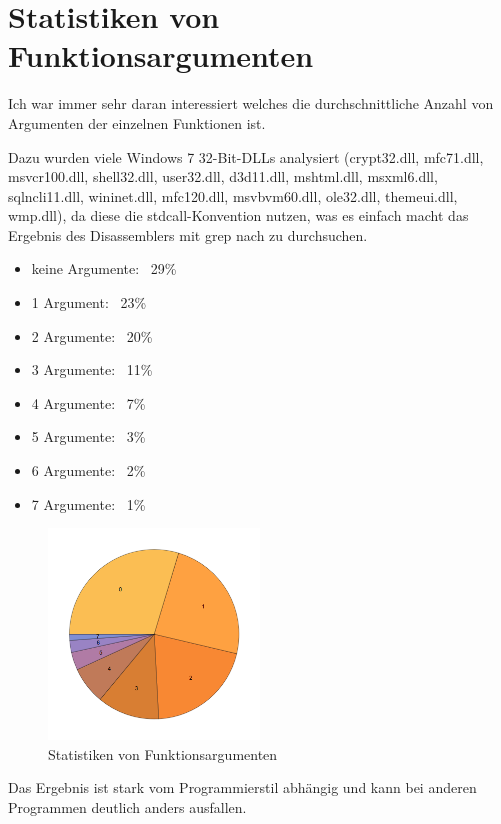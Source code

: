\section{Statistiken von Funktionsargumenten}
\label{args_stat}

Ich war immer sehr daran interessiert welches die durchschnittliche Anzahl von
Argumenten der einzelnen Funktionen ist.

Dazu wurden viele Windows 7 32-Bit-DLLs analysiert
(crypt32.dll, mfc71.dll, msvcr100.dll, shell32.dll, user32.dll, d3d11.dll, mshtml.dll,
msxml6.dll, sqlncli11.dll, wininet.dll, mfc120.dll, msvbvm60.dll, ole32.dll, themeui.dll,
wmp.dll), da diese die stdcall-Konvention nutzen, was es einfach macht das Ergebnis des
Disassemblers mit grep nach  zu durchsuchen.

\begin{itemize}
\item keine Argumente: ~29\%
\item 1 Argument: ~23\%
\item 2 Argumente: ~20\%
\item 3 Argumente: ~11\%
\item 4 Argumente: ~7\%
\item 5 Argumente: ~3\%
\item 6 Argumente: ~2\%
\item 7 Argumente: ~1\%
\end{itemize}

\begin{figure}[H]
\centering
\includegraphics[width=0.5\textwidth]{other/args_stat.png}
\caption{Statistiken von Funktionsargumenten}
\end{figure}

Das Ergebnis ist stark vom Programmierstil abhängig und kann bei anderen Programmen
deutlich anders ausfallen.
